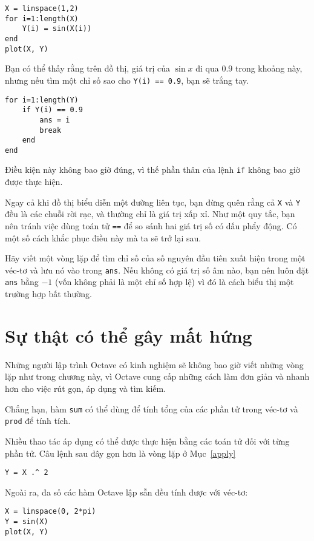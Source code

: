 \documentclass[12pt]{book}
\begin{document}
\begin{verbatim}
X = linspace(1,2)
for i=1:length(X)
    Y(i) = sin(X(i))
end
plot(X, Y)
\end{verbatim}
%
Bạn có thể thấy rằng trên đồ thị, giá trị của $\sin x$ đi qua
0.9 trong khoảng này, nhưng nếu tìm một chỉ số sao cho
{\tt Y(i) == 0.9}, bạn sẽ trắng tay.

\begin{verbatim}
for i=1:length(Y)
    if Y(i) == 0.9
        ans = i
        break
    end
end
\end{verbatim}
%
Điều kiện này không bao giờ đúng, vì thế phần thân của lệnh {\tt if} 
không bao giờ được thực hiện.

Ngay cả khi đồ thị biểu diễn một đường liên tục, bạn đừng quên rằng
cả {\tt X} và {\tt Y} đều là các chuỗi rời rạc, và thường chỉ là 
giá trị xấp xỉ. Như một quy tắc, bạn nên tránh việc dùng toán tử 
{\tt ==} để so sánh hai giá trị số có dấu phẩy động. Có một số cách
khắc phục điều này mà ta sẽ trở lại sau.

\begin{ex}
Hãy viết một vòng lặp để tìm chỉ số của số nguyên đầu tiên xuất hiện
trong một véc-tơ và lưu nó vào trong {\tt ans}.  Nếu không có
giá trị số âm nào, bạn nên luôn đặt {\tt ans} bằng $-1$ (vốn
không phải là một chỉ số hợp lệ) vì đó là cách biểu thị một trường
hợp bất thường.
\end{ex}



\section{Sự thật có thể gây mất hứng}

Những người lập trình Octave có kinh nghiệm sẽ không bao giờ viết
những vòng lặp như trong chương này, vì Octave cung cấp những cách
làm đơn giản và nhanh hơn cho việc rút gọn, áp dụng và tìm kiếm.

Chẳng hạn, hàm {\tt sum} có thể dùng để tính tổng của các phần tử
trong véc-tơ và {\tt prod} để tính tích.

Nhiều thao tác áp dụng có thể được thực hiện bằng các toán tử đối
với từng phần tử. Câu lệnh sau đây gọn hơn là vòng lặp ở 
Mục~\ref{apply}

\begin{verbatim}
Y = X .^ 2
\end{verbatim}
%
Ngoài ra, đa số các hàm Octave lập sẵn đều tính được với véc-tơ:

\begin{verbatim}
X = linspace(0, 2*pi)
Y = sin(X)
plot(X, Y)
\end{verbatim}
\end{document}
